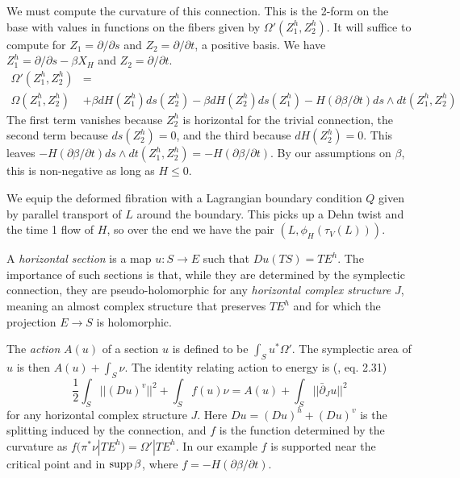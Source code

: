 \documentclass[12pt]{amsart}
\begin{document}
We must compute the curvature of this connection. This is the 2-form
on the base with values in functions on the fibers given by
$\Omega'(Z_1^h,Z_2^h)$. It will suffice to compute for $Z_1
= \partial/\partial s$ and $Z_2 = \partial/ \partial t$, a positive
basis. We have $Z_1^h = \partial/\partial s - \beta X_H$ and $Z_2
= \partial/\partial t$.
\begin{equation}
\begin{split}
  \Omega'(Z_1^h,Z_2^h) &=\\
 \Omega(Z_1^h,Z_2^h) &+ \beta
  dH(Z_1^h)ds(Z_2^h) - \beta dH(Z_2^h)ds(Z_1^h) -
  H(\partial\beta/\partial t) ds\wedge dt(Z_1^h,Z_2^h)
\end{split}
\end{equation}
The first term vanishes because $Z_2^h$ is horizontal for the trivial
connection, the second term because $ds(Z_2^h) = 0$, and the third
because $dH(Z_2^h) = 0$. This leaves $-H(\partial\beta/ \partial
t)ds\wedge dt(Z_1^h,Z_2^h) = -H(\partial \beta/\partial t)$. By our
assumptions on $\beta$, this is non-negative as long as $H \leq 0$.

We equip the deformed fibration with a Lagrangian boundary condition $Q$
given by parallel transport of $L$ around the boundary. This picks up
a Dehn twist and the time 1 flow of $H$, so over the end we have the
pair $(L,\phi_H(\tau_V(L)))$.

A \emph{horizontal section} is a map $u: S \to E$ such that $Du(TS) =
TE^h$. The importance of such sections is that, while they are
determined by the symplectic connection, they are pseudo-holomorphic
for any \emph{horizontal complex structure} $J$, meaning an almost
complex structure that preserves $TE^h$ and for which the projection $E \to S$ is holomorphic.

The \emph{action} $A(u)$ of a section $u$ is defined to be $\int_S u^*
\Omega'$. The symplectic area of $u$ is then $A(u) + \int_S \nu$. The
identity relating action to energy is (\cite{seidel-les}, eq. 2.31)
\begin{equation}
  \label{eq:energy-action}
\frac{1}{2}  \int_S ||(Du)^v||^2 + \int_S f(u) \nu = A(u) + \int_S
||\bar{\partial}_J u||^2
\end{equation}
for any horizontal complex structure $J$. Here $Du = (Du)^h + (Du)^v$
is the splitting induced by the connection, and $f$ is the function
determined by the curvature as $f(\pi^*\nu|TE^h) = \Omega'|TE^h$. In
our example $f$ is supported near the critical point and in $\operatorname{supp}
\beta$, where $f = -H(\partial\beta/\partial t)$. 
\end{document}
